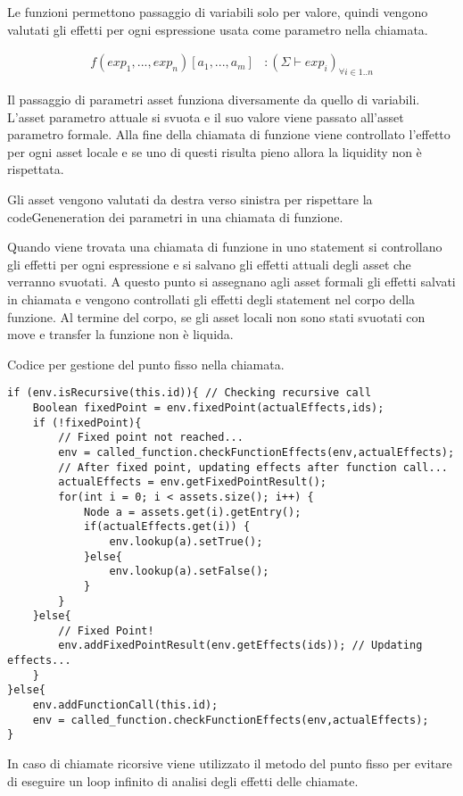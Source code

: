 \documentclass[12pt,twoside,openright,a4paper]{report}
\begin{document}
Le funzioni permettono passaggio di variabili solo per valore, quindi vengono valutati gli effetti per ogni espressione usata come parametro nella chiamata.

\begin{align*}
    f(exp_{1}, ..., exp_{n})[a_{1}, ...,a_{m}] & : (\Sigma \vdash exp_{i})_{\forall{i \in 1..n}}
\end{align*}

Il passaggio di parametri asset funziona diversamente da quello di variabili. L'asset parametro attuale si svuota e il suo valore viene passato all'asset parametro formale. Alla fine della chiamata di funzione viene controllato l'effetto per ogni asset locale e se uno di questi risulta pieno allora la liquidity non è rispettata.

Gli asset vengono valutati da destra verso sinistra per rispettare la codeGeneneration dei parametri in una chiamata di funzione.

Quando viene trovata una chiamata di funzione in uno statement si controllano gli effetti per ogni espressione e si salvano gli effetti attuali degli asset che verranno svuotati. A questo punto si assegnano agli asset formali gli effetti salvati in chiamata e vengono controllati gli effetti degli statement nel corpo della funzione. Al termine del corpo, se gli asset locali non sono stati svuotati con move e transfer la funzione non è liquida.

Codice per gestione del punto fisso nella chiamata.
\begin{lstlisting}
if (env.isRecursive(this.id)){ // Checking recursive call
    Boolean fixedPoint = env.fixedPoint(actualEffects,ids);
    if (!fixedPoint){
        // Fixed point not reached...
        env = called_function.checkFunctionEffects(env,actualEffects);
        // After fixed point, updating effects after function call...
        actualEffects = env.getFixedPointResult();
        for(int i = 0; i < assets.size(); i++) {
            Node a = assets.get(i).getEntry();
            if(actualEffects.get(i)) {
                env.lookup(a).setTrue();
            }else{
                env.lookup(a).setFalse();
            }
        }
    }else{
        // Fixed Point!
        env.addFixedPointResult(env.getEffects(ids)); // Updating effects...
    }
}else{
    env.addFunctionCall(this.id);
    env = called_function.checkFunctionEffects(env,actualEffects);
}
\end{lstlisting}

In caso di chiamate ricorsive viene utilizzato il metodo del punto fisso per evitare di eseguire un loop infinito di analisi degli effetti delle chiamate.
\end{document}
